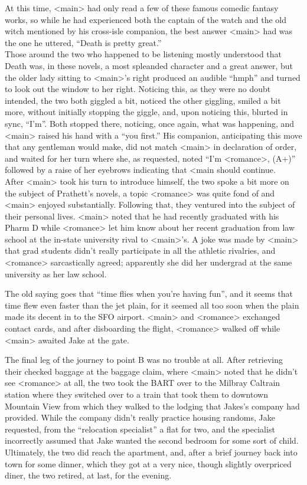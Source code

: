 \documentclass[12pt,openany]{memoir}
\begin{document}
At this time, <main> had only read a few of these famous comedic fantasy works, so while he had experienced both the captain of the watch and the old witch mentioned by his cross-isle companion, the best answer <main> had was the one he uttered, ``Death is pretty great.''
\\

Those around the two who happened to be listening mostly understood that Death was, in these novels, a most spleanded character and a great answer, but the older lady sitting to <main>'s right produced an audible ``hmph'' and turned to look out the window to her right.
Noticing this, as they were no doubt intended, the two both giggled a bit, noticed the other giggling, smiled a bit more, without initially stopping the giggle, and, upon noticing this, blurted in sync, ``I'm''.
Both stopped there, noticing, once again, what was happening, and <main> raised his hand with a ``you first.''
His companion, anticipating this move that any gentleman would make, did not match <main> in declaration of order, and waited for her turn where she, as requested, noted ``I'm <romance>, (A+)'' followed by a raise of her eyebrows indicating that <main should continue.
\\

After <main> took his turn to introduce himself, the two spoke a bit more on the subject of Prathett's novels, a topic <romance> was quite fond of and <main> enjoyed substantially.
Following that, they ventured into the subject of their personal lives.
<main> noted that he had recently graduated with his Pharm D while <romance> let him know about her recent graduation from law school at the in-state university rival to <main>'s.
A joke was made by <main> that grad students didn't really participate in all the athletic rivalries, and <romance> sarcastically agreed; apparently she did her undergrad at the same university as her law school.

The old saying goes that ``time flies when you're having fun'', and it seems that time flew even faster than the jet plain, for it seemed all too soon when the plain made its decent in to the SFO airport.
<main> and <romance> exchanged contact cards, and after disboarding the flight, <romance> walked off while <main> awaited Jake at the gate.

The final leg of the journey to point B was no trouble at all.
After retrieving their checked baggage at the baggage claim, where <main> noted that he didn't see <romance> at all, the two took the BART over to the Milbray Caltrain station where they switched over to a train that took them to downtown Mountain View from which they walked to the lodging that Jakes's company had provided.
While the company didn't really practice housing randoms, Jake requested, from the ``relocation specialist'' a flat for two, and the specialist incorrectly assumed that Jake wanted the second bedroom for some sort of child.
Ultimately, the two did reach the apartment, and, after a brief journey back into town for some dinner, which they got at a very nice, though slightly overpriced diner, the two retired, at last, for the evening.
\end{document}
